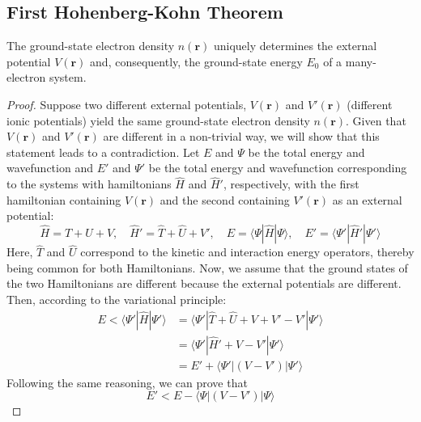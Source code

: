 \subsection{First Hohenberg-Kohn Theorem}

\begin{theorem}
  The ground-state electron density $n(\mathbf{r})$ uniquely determines the external potential $V(\mathbf{r})$ and, consequently, the ground-state energy $E_0$ of a many-electron system.
\end{theorem}
\begin{proof}
  Suppose two different external potentials, $V(\mathbf{r})$ and $V'(\mathbf{r})$ (different ionic potentials) yield the same ground-state electron density $n(\mathbf{r})$. Given that $V(\mathbf{r})$ and $V'(\mathbf{r})$ are different in a non-trivial way, we will show that this statement leads to a contradiction. Let $E$ and $\Psi$ be the total energy and wavefunction and $E'$ and $\Psi'$ be the total energy and wavefunction corresponding to the systems with hamiltonians $\hat{H}$ and $\hat{H}'$, respectively, with the first hamiltonian containing $V(\mathbf{r})$  and the second containing $V'(\mathbf{r})$ as an external potential:
  \begin{equation*}
    \hat{H} = \hat{T} + \hat{U} + V, \quad \hat{H}' = \hat{T} + \hat{U} + V', \quad E = \langle \Psi | \hat{H} | \Psi \rangle, \quad E' = \langle \Psi' | \hat{H}' | \Psi' \rangle 
  \end{equation*}
  Here, $\hat{T}$ and $\hat{U}$ correspond to the kinetic and interaction energy operators, thereby being common for both Hamiltonians. Now, we assume that the ground states of the two Hamiltonians are different because the external potentials are different. Then, according to the variational principle: 
  \begin{equation}
    \label{eq40}
    \begin{aligned}
      E < \langle \Psi'|\hat{H}|\Psi'\rangle &= \langle \Psi'|\hat{T} + \hat{U} + V + V' - V' |\Psi'\rangle \\
      &= \langle \Psi'|\hat{H}' + V - V' |\Psi'\rangle \\
      &= E' + \langle \Psi'|(V - V')|\Psi'\rangle
    \end{aligned}
  \end{equation}
  Following the same reasoning, we can prove that 
  \begin{equation}
    \label{eq41}
    E' < E - \langle \Psi|(V - V')|\Psi\rangle
  \end{equation}

\end{proof}
